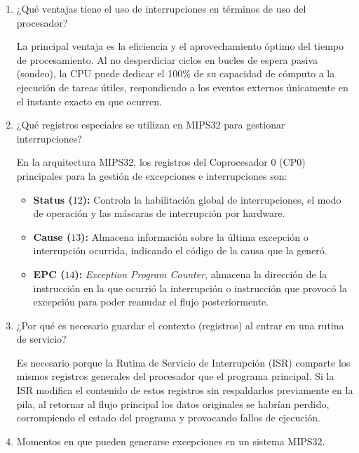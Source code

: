 \documentclass[12pt,a4paper]{article}
\begin{document}
\begin{enumerate}[label=\arabic*.]
    \item ¿Qué ventajas tiene el uso de interrupciones en términos de uso del procesador?

    \vspace{0.3cm}
    \noindent
    La principal ventaja es la eficiencia y el aprovechamiento óptimo del tiempo de procesamiento. Al no desperdiciar ciclos en bucles de espera pasiva (sondeo), la CPU puede dedicar el 100\% de su capacidad de cómputo a la ejecución de tareas útiles, respondiendo a los eventos externos únicamente en el instante exacto en que ocurren.

    \item ¿Qué registros especiales se utilizan en MIPS32 para gestionar interrupciones?

    \vspace{0.3cm}
    \noindent
    En la arquitectura MIPS32, los registros del Coprocesador 0 (CP0) principales para la gestión de excepciones e interrupciones son:
    \begin{itemize}
        \item \textbf{Status ($12$):} Controla la habilitación global de interrupciones, el modo de operación y las máscaras de interrupción por hardware.
        \item \textbf{Cause ($13$):} Almacena información sobre la última excepción o interrupción ocurrida, indicando el código de la causa que la generó.
        \item \textbf{EPC ($14$):} \textit{Exception Program Counter}, almacena la dirección de la instrucción en la que ocurrió la interrupción o instrucción que provocó la excepción para poder reanudar el flujo posteriormente.
    \end{itemize}

    \item ¿Por qué es necesario guardar el contexto (registros) al entrar en una rutina de servicio?

    \vspace{0.3cm}
    \noindent
    Es necesario porque la Rutina de Servicio de Interrupción (ISR) comparte los mismos registros generales del procesador que el programa principal. Si la ISR modifica el contenido de estos registros sin respaldarlos previamente en la pila, al retornar al flujo principal los datos originales se habrían perdido, corrompiendo el estado del programa y provocando fallos de ejecución.

    \item Momentos en que pueden generarse excepciones en un sistema MIPS32.
    

\end{enumerate}
\end{document}
